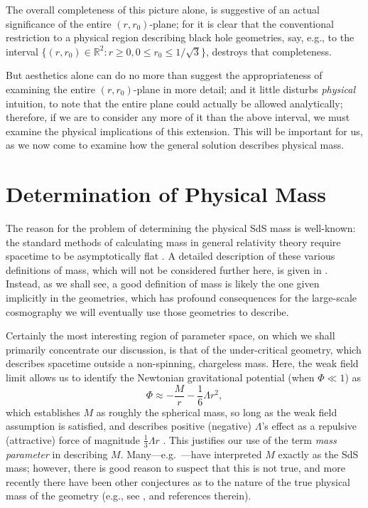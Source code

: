 The overall completeness of this picture alone, is suggestive of an actual significance of the entire $(r,r_0)$-plane; for it is clear that the conventional restriction to a physical region describing black hole geometries, say, e.g., to the interval $\{(r,r_0)\in\mathbb{R}^2:r\geq0,0\leq{r_0}\leq1/\sqrt{3}\}$, destroys that completeness.

But aesthetics alone can do no more than suggest the appropriateness of examining the entire $(r,r_0)$-plane in more detail; and it little disturbs \textit{physical} intuition, to note that the entire plane could actually be allowed analytically; therefore, if we are to consider any more of it than the above interval, we must examine the physical implications of this extension. This will be important for us, as we now come to examine how the general solution describes physical mass.

\section{Determination of Physical Mass \label{sec_DPM}}
The reason for the problem of determining the physical SdS mass is well-known: the standard methods of calculating mass in general relativity theory require spacetime to be asymptotically flat \cite{Penrose2011}. A detailed description of these various definitions of mass, which will not be considered further here, is given in \cite{Wald1984}. Instead, as we shall see, a good definition of mass is likely the one given implicitly in the geometries, which has profound consequences for the large-scale cosmography we will eventually use those geometries to describe.

Certainly the most interesting region of parameter space, on which we shall primarily concentrate our discussion, is that of the under-critical geometry, which describes spacetime outside a non-spinning, chargeless mass. Here, the weak field limit allows us to identify the Newtonian gravitational potential (when $\Phi\ll1$) as
\begin{equation}
\Phi\approx-\frac{M}{r}-\frac{1}{6}\Lambda{r}^2,\label{Newton_potential}
\end{equation}
which establishes $M$ as roughly the spherical mass, so long as the weak field assumption is satisfied, and describes positive (negative) $\Lambda$'s effect as a repulsive (attractive) force of magnitude $\frac{1}{3}\Lambda{r}$ \cite{Rindler2001}. This justifies our use of the term \textit{mass parameter} in describing $M$. Many---e.g.~\cite{Gibbons1977,Bazanski1986,Jaklitsch1989,Bicak1995}---have interpreted $M$ exactly as the SdS mass; however, there is good reason to suspect that this is not true, and more recently there have been other conjectures as to the nature of the true physical mass of the geometry (e.g., see \cite{Corichi2004}, and references therein). 

